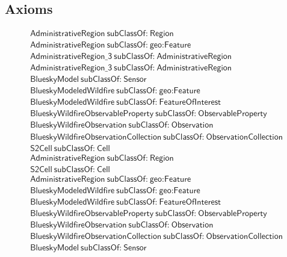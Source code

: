 \subsection{Axioms}
\begin{align}
  \textsf{AdministrativeRegion}~\textsf{subClassOf:}~\textsf{Region}\\
  \textsf{AdministrativeRegion}~\textsf{subClassOf:}~\textsf{geo:Feature}\\
  \textsf{AdministrativeRegion\_3}~\textsf{subClassOf:}~\textsf{AdministrativeRegion}\\
  \textsf{AdministrativeRegion\_3}~\textsf{subClassOf:}~\textsf{AdministrativeRegion}\\
  \textsf{BlueskyModel}~\textsf{subClassOf:}~\textsf{Sensor}\\
  \textsf{BlueskyModeledWildfire}~\textsf{subClassOf:}~\textsf{geo:Feature}\\
  \textsf{BlueskyModeledWildfire}~\textsf{subClassOf:}~\textsf{FeatureOfInterest}\\
  \textsf{BlueskyWildfireObservableProperty}~\textsf{subClassOf:}~\textsf{ObservableProperty}\\
  \textsf{BlueskyWildfireObservation}~\textsf{subClassOf:}~\textsf{Observation}\\
  \textsf{BlueskyWildfireObservationCollection}~\textsf{subClassOf:}~\textsf{ObservationCollection}\\
  \textsf{S2Cell}~\textsf{subClassOf:}~\textsf{Cell}\\
  \textsf{AdministrativeRegion}~\textsf{subClassOf:}~\textsf{Region}\\
  \textsf{S2Cell}~\textsf{subClassOf:}~\textsf{Cell}\\
  \textsf{AdministrativeRegion}~\textsf{subClassOf:}~\textsf{geo:Feature}\\
  \textsf{BlueskyModeledWildfire}~\textsf{subClassOf:}~\textsf{geo:Feature}\\
  \textsf{BlueskyModeledWildfire}~\textsf{subClassOf:}~\textsf{FeatureOfInterest}\\
  \textsf{BlueskyWildfireObservableProperty}~\textsf{subClassOf:}~\textsf{ObservableProperty}\\
  \textsf{BlueskyWildfireObservation}~\textsf{subClassOf:}~\textsf{Observation}\\
  \textsf{BlueskyWildfireObservationCollection}~\textsf{subClassOf:}~\textsf{ObservationCollection}\\
  \textsf{BlueskyModel}~\textsf{subClassOf:}~\textsf{Sensor}\\

\end{align}
